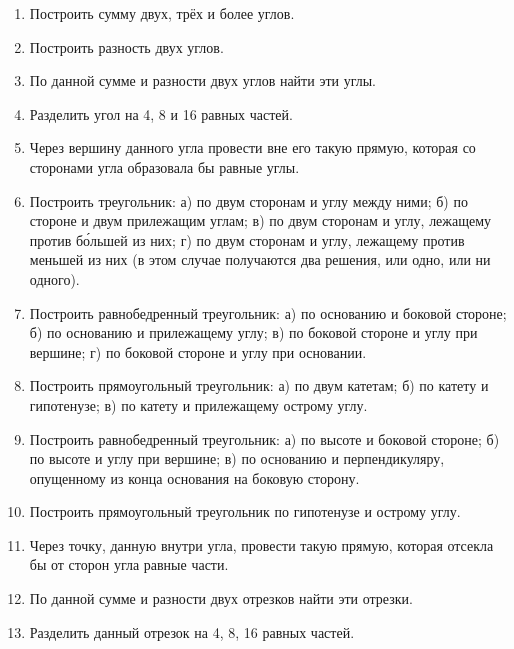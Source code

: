 \documentclass[oneside]{book}
\begin{document}
\begin{enumerate}[resume]

 \item
Построить сумму двух, трёх и более углов.

 \item
Построить разность двух углов.

 \item
По данной сумме и разности двух углов найти эти углы.

 \item
Разделить угол на 4, 8 и 16 равных частей.

 \item
Через вершину данного угла провести вне его такую прямую, которая со сторонами угла образовала бы равные углы.

 \item
Построить треугольник:
а) по двум сторонам и углу между ними;
б) по стороне и двум прилежащим углам;
в) по двум сторонам и углу, лежащему против б\'{о}льшей из них;
г) по двум сторонам и углу, лежащему против меньшей из них (в этом случае получаются два решения, или одно, или ни одного).

 \item
Построить равнобедренный треугольник:
а) по основанию и боковой стороне;
б) по основанию и прилежащему углу;
в) по боковой стороне и углу при вершине;
г) по боковой стороне и углу при основании.

 \item
Построить прямоугольный треугольник:
а) по двум катетам;
б) по катету и гипотенузе;
в) по катету и прилежащему острому углу.

 \item
Построить равнобедренный треугольник:
а) по высоте и боковой стороне;
б) по высоте и углу при вершине;
в) по основанию и перпендикуляру, опущенному из конца основания на боковую сторону.

 \item
Построить прямоугольный треугольник по гипотенузе и острому углу.

 \item
Через точку, данную внутри угла, провести такую прямую, которая отсекла бы от сторон угла равные части.

 \item
По данной сумме и разности двух отрезков найти эти отрезки.

 \item
Разделить данный отрезок на 4, 8, 16 равных частей.


\end{enumerate}
\end{document}
